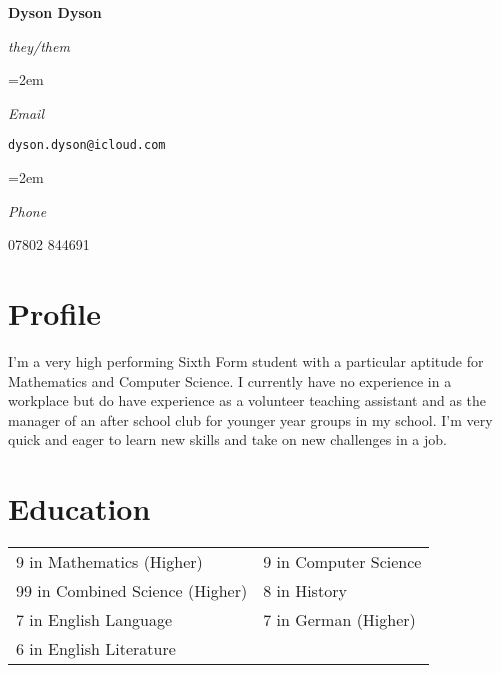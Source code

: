 \documentclass[a4paper, 12pt]{article}
\newlength{\spacebox}
\newcommand{\sepspace}{\vspace*{1em}}
\newcommand{\name}[1]{
	\Huge
	\begin{center}\textbf{#1}\end{center}\par
	\normalsize}
\newcommand{\pronouns}[1]{
	\normalsize
	\begin{center}\textsl{#1}\end{center}\par}
\newcommand{\info}[2]{
	\noindent\hangindent=2em\hangafter=0
	\parbox{\spacebox}{%
		\textsl{#1}}
	#2\par}
\begin{document}
\name{Dyson Dyson}
\vspace*{-1.5em}
\pronouns{they/them}

\sepspace

\info{Email}{\texttt{dyson.dyson@icloud.com}}
\info{Phone}{07802 844691}

\section*{Profile}
I'm a very high performing Sixth Form student with a particular aptitude for Mathematics and Computer Science. I currently have no experience in a workplace but do have experience as a volunteer teaching assistant and as the manager of an after school club for younger year groups in my school. I'm very quick and eager to learn new skills and take on new challenges in a job.


\section*{Education}

\begin{center}
\end{center}

\begin{center}
	\begin{tabular}{m{16em} m{10em}}
		9 in Mathematics (Higher) & 9 in Computer Science \\
		99 in Combined Science (Higher) & 8 in History \\
		7 in English Language & 7 in German (Higher) \\
		6 in English Literature
	\end{tabular}
\end{center}
\end{document}
